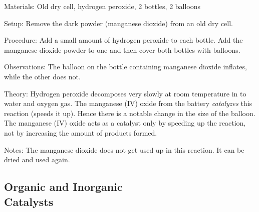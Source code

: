 \begin{multicols}{2}
\begin{description*}
\item[Materials:]{Old dry cell, hydrogen peroxide, 2 bottles, 2 balloons}
\item[Setup:]{Remove the dark powder (manganese dioxide) from an old dry cell.}
\item[Procedure:]{Add a small amount of hydrogen peroxide to each bottle. Add the manganese dioxide powder to one and then cover both bottles with balloons.}
\item[Observations:]{The balloon on the bottle containing manganese dioxide inflates, while the other does not.}
\item[Theory:]{Hydrogen peroxide decomposes very slowly at room temperature in to water and oxygen gas. The manganese (IV) oxide from the battery \emph{catalyzes} this reaction (speeds it up). Hence there is a notable change in the size of the balloon. The manganese (IV) oxide acts as a catalyst only by speeding up the reaction, not by increasing the amount of products formed.}
\item[Notes:]{The manganese dioxide does not get used up in this reaction. It can be dried and used again.}
\end{description*}

\columnbreak

\subsection{Organic and Inorganic \hfill \\ Catalysts} %



\end{multicols}
